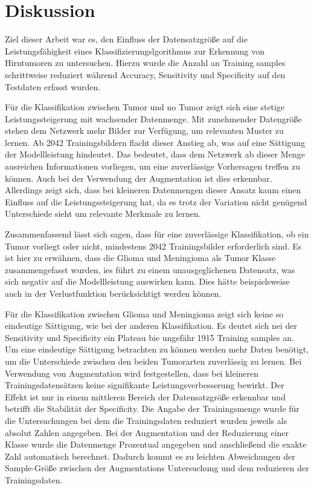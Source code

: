 \chapter{Diskussion}
Ziel dieser Arbeit war es, den Einfluss der Datensatzgröße auf die Leistungsfähigkeit eines Klassifizierungslgorithmus zur Erkennung von Hirntumoren zu untersuchen.
Hierzu wurde die Anzahl an Training samples schrittweise reduziert während Accuracy, Sensitivity und Specificity auf den Testdaten erfasst wurden.

Für die Klassifikation zwischen Tumor und no Tumor zeigt sich eine stetige Leistungssteigerung mit wachsender Datenmenge.
Mit zunehmender Datengröße stehen dem Netzwerk mehr Bilder zur Verfügung, um relevanten Muster zu lernen. 
Ab 2042 Trainingsbildern flacht dieser Anstieg ab, was auf eine Sättigung der Modellleistung hindeutet.
Das bedeutet, dass dem Netzwerk ab dieser Menge ausreichen Informationen vorliegen, um eine zuverlässige Vorhersagen treffen zu können.
Auch bei der Verwendung der Augmentation ist dies erkennbar.
Allerdings zeigt sich, dass bei kleineren Datenmengen dieser Ansatz kaum einen Einfluss auf die Leistungssteigerung hat, da es trotz der Variation nicht 
genügend Unterschiede sieht um relevante Merkmale zu lernen. 

Zusammenfassend lässt sich sagen, dass für eine zuverlässige Klassifikation, ob ein Tumor vorliegt oder nicht, mindestens 2042 Trainingsbilder erforderlich sind.
Es ist hier zu erwähnen, dass die Glioma und Meningioma als Tumor Klasse zusammengefasst wurden,
ies führt zu einem unausgeglichenen Datensatz, was sich negativ auf die Modellleistung auswirken kann.
Dies hätte beispielsweise auch in der Verlustfunktion berücksichtigt werden können.

Für die Klassifikation zwischen Glioma und Meningioma zeigt sich keine so eindeutige Sättigung, wie bei der anderen Klassifikation.
Es deutet sich nei der Sensitivity und Specificity ein Plateau bie ungefähr 1915 Training samples an. 
Um eine eindeutige Sättigung betrachten zu können werden mehr Daten benötigt, um die Unterschiede zwischen den beiden Tumorarten zuverlässig zu lernen.
Bei Verwendung von Augmentation wird festgestellen, dass bei kleineren Trainingsdatensätzen keine signifikante Leistungsverbesserung bewirkt. 
Der Effekt ist nur in einem mittleren Bereich der Datensatzgröße erkennbar und betrifft die Stabilität der Specificity. 
Die Angabe der Trainingsmenge wurde für die Untersuchungen bei dem die Trainingsdaten reduziert wurden jeweils als absolut Zahlen angegeben.
Bei der Augmentation und der Reduzierung einer Klasse wurde die Datenmenge Prozentual angegeben und anschließend die exakte Zahl automatisch berechnet.
Dadurch kommt es zu leichten Abweichungen der Sample-Größe zwischen der Augmentations Untersuchung und dem reduzieren der Trainingsdaten. 

